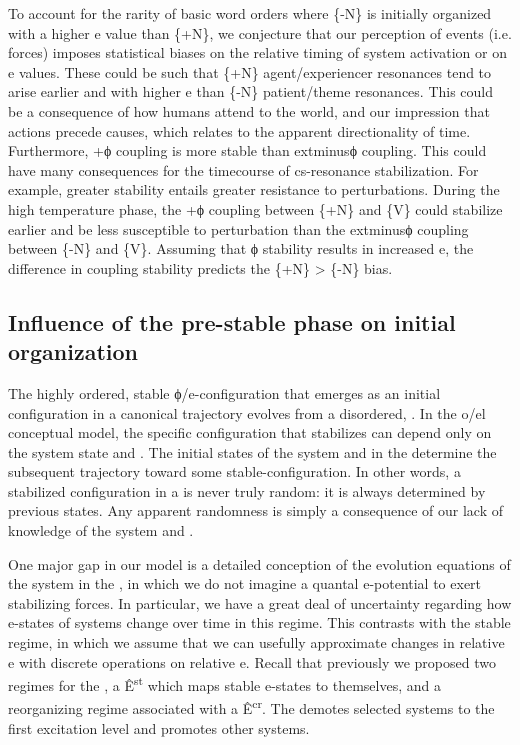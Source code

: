   To account for the rarity of basic word orders where \{-N\} is initially organized with a higher e value than \{+N\}, we conjecture that our perception of events (i.e.  forces) imposes statistical biases on the relative timing of system activation or on e values. These could be such that \{+N\} agent/experiencer resonances tend to arise earlier and with higher e than \{-N\} patient/theme resonances. This could be a consequence of how humans attend to the world, and our impression that actions precede causes, which relates to the apparent directionality of time. Furthermore, +ϕ coupling is more stable than 	extminus{}ϕ coupling. This could have many consequences for the timecourse of cs-resonance stabilization. For example, greater stability entails greater resistance to perturbations. During the high temperature phase, the +ϕ coupling between \{+N\} and \{V\} could stabilize earlier and be less susceptible to perturbation than the 	extminus{}ϕ coupling between \{-N\} and \{V\}. Assuming that ϕ stability results in increased e, the difference in coupling stability predicts the \{+N\} > \{-N\} bias.

\subsection{Influence of the pre-stable phase on initial organization}

The highly ordered, stable ϕ/e-con\-fig\-u\-ra\-tion that emerges as an initial configuration in a canonical trajectory evolves from a disordered, . In the o/el conceptual model, the specific configuration that stabilizes can depend only on the system state and . The initial states of the system and  in the  determine the subsequent trajectory toward some stable-con\-fig\-u\-ra\-tion. In other words, a stabilized configuration in a  is never truly random: it is always determined by previous states. Any apparent randomness is simply a consequence of our lack of knowledge of the system and .

  One major gap in our model is a detailed conception of the evolution equations of the system in the , in which we do not imagine a quantal e-potential to exert stabilizing forces. In particular, we have a great deal of uncertainty regarding how e-states of systems change over time in this regime. This contrasts with the stable regime, in which we assume that we can usefully approximate changes in relative e with discrete operations on relative e. Recall that previously we proposed two regimes for the , a  Ê\textsuperscript{st} which maps stable e-states to themselves, and a reorganizing regime associated with a  Ê\textsuperscript{cr}. The  demotes selected systems to the first excitation level and promotes other systems. 

